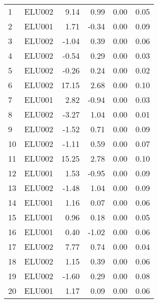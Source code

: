 \begin{center}
\begin{footnotesize}
\tablelasttail{\hline}
\begin{supertabular}{|l|r|r|r|r|r|}
1 & ELU002 &  9.14 &  0.99 &  0.00 & 0.05\\
2 & ELU001 &  1.71 & -0.34 &  0.00 & 0.09\\
3 & ELU002 & -1.04 &  0.39 &  0.00 & 0.06\\
4 & ELU002 & -0.54 &  0.29 &  0.00 & 0.03\\
5 & ELU002 & -0.26 &  0.24 &  0.00 & 0.02\\
6 & ELU002 & 17.15 &  2.68 &  0.00 & 0.10\\
7 & ELU001 &  2.82 & -0.94 &  0.00 & 0.03\\
8 & ELU002 & -3.27 &  1.04 &  0.00 & 0.01\\
9 & ELU002 & -1.52 &  0.71 &  0.00 & 0.09\\
10 & ELU002 & -1.11 &  0.59 &  0.00 & 0.07\\
11 & ELU002 & 15.25 &  2.78 &  0.00 & 0.10\\
12 & ELU001 &  1.53 & -0.95 &  0.00 & 0.09\\
13 & ELU002 & -1.48 &  1.04 &  0.00 & 0.09\\
14 & ELU001 &  1.16 &  0.07 &  0.00 & 0.06\\
15 & ELU001 &  0.96 &  0.18 &  0.00 & 0.05\\
16 & ELU001 &  0.40 & -1.02 &  0.00 & 0.06\\
17 & ELU002 &  7.77 &  0.74 &  0.00 & 0.04\\
18 & ELU002 &  1.15 &  0.39 &  0.00 & 0.06\\
19 & ELU002 & -1.60 &  0.29 &  0.00 & 0.08\\
20 & ELU001 &  1.17 &  0.09 &  0.00 & 0.06\\
\end{supertabular}
\end{footnotesize}
\end{center}
